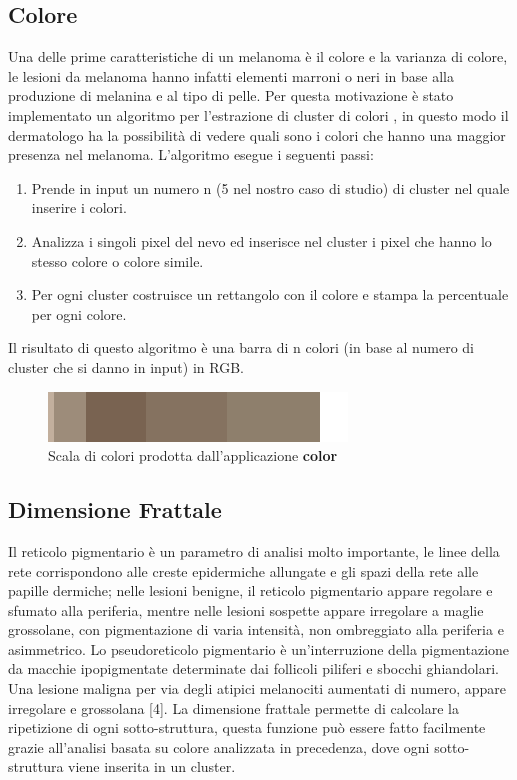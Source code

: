\subsection{Colore}
Una delle prime caratteristiche di un melanoma è il colore e la varianza di colore, le lesioni da melanoma hanno infatti elementi marroni o neri in base alla produzione di melanina e al tipo di pelle.
\newline
Per questa motivazione è stato implementato un algoritmo per l'estrazione di cluster di colori \cite{faziloglu2003colour}, in questo modo il dermatologo ha la possibilità di vedere quali sono i colori che hanno una maggior presenza nel melanoma.
\newline
L'algoritmo esegue i seguenti passi:
\begin{enumerate}
	\item Prende in input un numero n (5 nel nostro caso di studio) di cluster nel quale inserire i colori.
	\item Analizza i singoli pixel del nevo ed inserisce nel cluster i pixel che hanno lo stesso colore o colore simile.
	\item Per ogni cluster costruisce un rettangolo con il colore e stampa la percentuale per ogni colore.
\end{enumerate}
Il risultato di questo algoritmo è una barra di n colori (in base al numero di cluster che si danno in input) in RGB. 
	\begin{figure}[h]
	\begin{center}
		\includegraphics[scale=0.5]{figure/capitolo6/color.png}
	\end{center}
	\caption{Scala di colori prodotta dall'applicazione \textbf{color}}	
	\end{figure}
\newpage
\subsection{Dimensione Frattale}
Il reticolo pigmentario è un parametro di analisi molto importante, le linee della rete corrispondono alle creste epidermiche allungate e gli spazi della rete alle papille dermiche; nelle lesioni benigne, il reticolo pigmentario appare regolare e sfumato alla periferia, mentre nelle lesioni sospette appare irregolare a maglie grossolane, con pigmentazione di varia intensità, non ombreggiato alla periferia e asimmetrico.
Lo pseudoreticolo pigmentario è un'interruzione della pigmentazione da macchie ipopigmentate determinate dai follicoli piliferi e sbocchi ghiandolari. Una lesione maligna per via degli atipici melanociti aumentati di numero, appare irregolare e grossolana [4].
\newline
La dimensione frattale permette di calcolare la ripetizione di ogni sotto-struttura, questa funzione può essere fatto facilmente grazie all'analisi basata su colore analizzata in precedenza, dove ogni sotto-struttura viene inserita in un cluster.
\newpage
